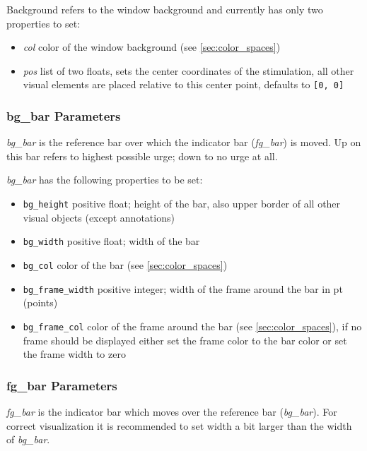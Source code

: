 \documentclass[12pt,a4paper]{book}
\begin{document}
Background refers to the window background and currently has only two properties to set:
\begin{itemize}
\item \textit{col} color of the window background (see \ref{sec:color_spaces})
\item \textit{pos} list of two floats, sets the center coordinates of the stimulation, all other visual elements are placed relative to this center point, defaults to \verb|[0, 0]|
\end{itemize}

\subsubsection{bg\_bar Parameters}

\textit{bg\_bar} is the reference bar over which the indicator bar (\textit{fg\_bar}) is moved. Up on this bar refers to highest possible urge; down to no urge at all.

\textit{bg\_bar} has the following properties to be set:
\begin{itemize}
\item \verb|bg_height| positive float; height of the bar, also upper border of all other visual objects (except annotations)
\item \verb|bg_width| positive float; width of the bar
\item \verb|bg_col| color of the bar (see \ref{sec:color_spaces})
\item \verb|bg_frame_width| positive integer; width of the frame around the bar in pt (points)
\item \verb|bg_frame_col| color of the frame around the bar (see \ref{sec:color_spaces}), if no frame should be displayed either set the frame color to the bar color or set the frame width to zero
\end{itemize}


\subsubsection{fg\_bar Parameters}

\textit{fg\_bar} is the indicator bar which moves over the reference bar (\textit{bg\_bar}). For correct visualization it is recommended to set width a bit larger than the width of \textit{bg\_bar}.
\end{document}
